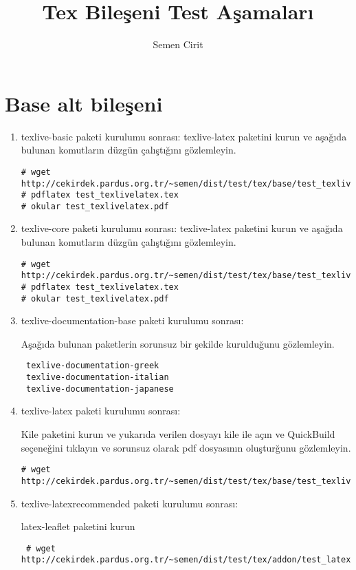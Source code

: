 \documentclass[a4paper,10pt]{article}
\title{Tex Bileşeni Test Aşamaları}
\author{Semen Cirit}
\begin{document}
\maketitle

\section{Base alt bileşeni}
\begin{enumerate}
 \item texlive-basic paketi kurulumu sonrası:
 texlive-latex paketini kurun ve aşağıda bulunan komutların düzgün çalıştığını gözlemleyin.

\begin{verbatim}
# wget http://cekirdek.pardus.org.tr/~semen/dist/test/tex/base/test_texlivelatex.tex
# pdflatex test_texlivelatex.tex
# okular test_texlivelatex.pdf
\end{verbatim}

\item texlive-core paketi kurulumu sonrası:
 texlive-latex paketini kurun ve aşağıda bulunan komutların düzgün çalıştığını gözlemleyin.

\begin{verbatim}
# wget http://cekirdek.pardus.org.tr/~semen/dist/test/tex/base/test_texlivelatex.tex
# pdflatex test_texlivelatex.tex
# okular test_texlivelatex.pdf
\end{verbatim}
\item texlive-documentation-base paketi kurulumu sonrası:

Aşağıda bulunan paketlerin sorunsuz bir şekilde kurulduğunu gözlemleyin.	
\begin{verbatim}
 texlive-documentation-greek
 texlive-documentation-italian
 texlive-documentation-japanese
\end{verbatim}
\item texlive-latex paketi kurulumu sonrası:

Kile paketini kurun ve yukarıda verilen dosyayı kile ile açın ve QuickBuild  seçeneğini tıklayın ve sorunsuz olarak pdf dosyasının oluşturğunu gözlemleyin.
\begin{verbatim}
# wget http://cekirdek.pardus.org.tr/~semen/dist/test/tex/base/test_texlivelatex.tex
\end{verbatim}

\item texlive-latexrecommended paketi kurulumu sonrası:

latex-leaflet paketini kurun
\begin{verbatim}
 # wget http://cekirdek.pardus.org.tr/~semen/dist/test/tex/addon/test_latexleaflet.tex
\end{verbatim}


\end{enumerate}
\end{document}
